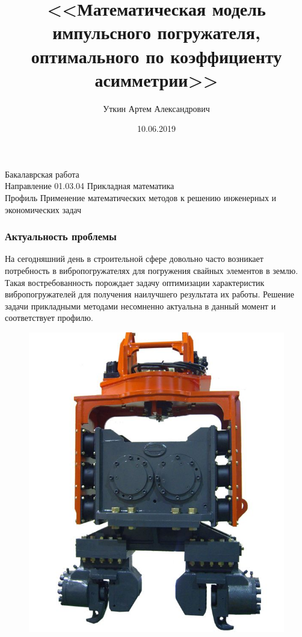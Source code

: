 \documentclass[10pt, pdf, hyperref={unicode}]{beamer}
\title{<<Математическая модель импульсного погружателя, оптимального по коэффициенту асимметрии>>}
\date{10.06.2019}
\author{Уткин Артем Александрович}
\begin{document}
    \begin{frame} %
        \titlepage
        \begin{center}
            Бакалаврская работа\\
            Направление 01.03.04 Прикладная математика\\
            Профиль Применение математических методов к решению инженерных и экономических задач
        \end{center}
    \end{frame}


    \begin{frame}
        \frametitle{Актуальность проблемы}
        \begin{center}
            \begin{minipage}[h]{0.97\linewidth}
                \begin{minipage}[h]{0.95\linewidth}
                    На сегодняшний день в строительной сфере довольно часто возникает потребность в вибропогружателях для погружения свайных элементов в землю.
                    \newline
                    Такая востребованность порождает задачу оптимизации характеристик вибропогружателей для получения наилучшего результата их работы.
                    \newline
                    Решение задачи прикладными методами несомненно актуальна в данный момент и соответствует профилю.
                \end{minipage}
                \begin{minipage}[h]{0.25\linewidth}
                    \begin{figure}[h]
                        \centering
                        \includegraphics[width=1\linewidth]{../img/photo_1.jpg}

\end{figure}
\end{minipage}
\end{minipage}
\end{center}
\end{frame}
\end{document}
